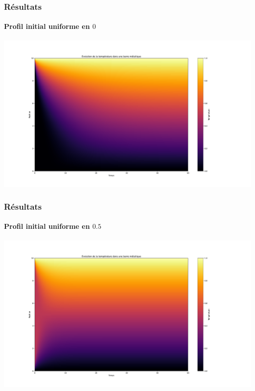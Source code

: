 \documentclass{beamer}
\begin{document}
    \begin{frame}
    \frametitle{Résultats}
    \framesubtitle{Profil initial uniforme en $0$}

    \begin{center}
    \includegraphics[width=1.2\linewidth]{figs/Figure_1.pdf}
    \end{center}


    \end{frame}


    \begin{frame}
    \frametitle{Résultats}
    \framesubtitle{Profil initial uniforme en $0.5$}

    \begin{center}
    \includegraphics[width=1.2\linewidth]{figs/Figure_2.pdf}
    \end{center}


    \end{frame}
\end{document}

